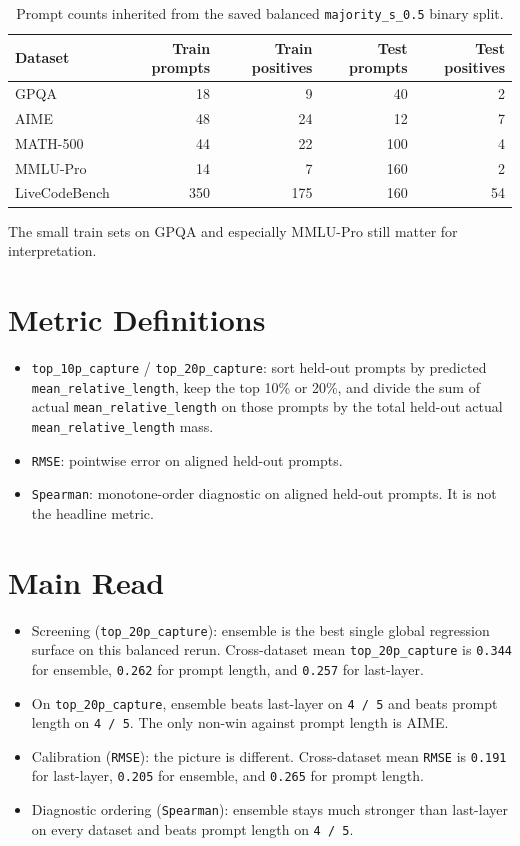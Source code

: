 \documentclass[11pt]{article}
\begin{document}
\begin{table}[h]
\centering
\small
\begin{tabular}{lrrrr}
\toprule
Dataset & Train prompts & Train positives & Test prompts & Test positives \\
\midrule
GPQA & 18 & 9 & 40 & 2 \\
AIME & 48 & 24 & 12 & 7 \\
MATH-500 & 44 & 22 & 100 & 4 \\
MMLU-Pro & 14 & 7 & 160 & 2 \\
LiveCodeBench & 350 & 175 & 160 & 54 \\
\bottomrule
\end{tabular}
\caption{Prompt counts inherited from the saved balanced \texttt{majority\_s\_0.5} binary split.}
\end{table}

The small train sets on GPQA and especially MMLU-Pro still matter for interpretation.

\section{Metric Definitions}

\begin{itemize}
\item \texttt{top\_10p\_capture} / \texttt{top\_20p\_capture}: sort held-out prompts by predicted \texttt{mean\_relative\_length}, keep the top 10\% or 20\%, and divide the sum of actual \texttt{mean\_relative\_length} on those prompts by the total held-out actual \texttt{mean\_relative\_length} mass.
\item \texttt{RMSE}: pointwise error on aligned held-out prompts.
\item \texttt{Spearman}: monotone-order diagnostic on aligned held-out prompts. It is not the headline metric.
\end{itemize}

\section{Main Read}

\begin{itemize}
\item Screening (\texttt{top\_20p\_capture}): ensemble is the best single global regression surface on this balanced rerun. Cross-dataset mean \texttt{top\_20p\_capture} is \texttt{0.344} for ensemble, \texttt{0.262} for prompt length, and \texttt{0.257} for last-layer.
\item On \texttt{top\_20p\_capture}, ensemble beats last-layer on \texttt{4 / 5} and beats prompt length on \texttt{4 / 5}. The only non-win against prompt length is AIME.
\item Calibration (\texttt{RMSE}): the picture is different. Cross-dataset mean \texttt{RMSE} is \texttt{0.191} for last-layer, \texttt{0.205} for ensemble, and \texttt{0.265} for prompt length.
\item Diagnostic ordering (\texttt{Spearman}): ensemble stays much stronger than last-layer on every dataset and beats prompt length on \texttt{4 / 5}.
\end{itemize}
\end{document}
